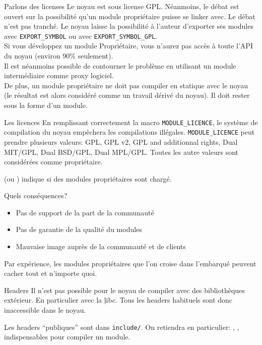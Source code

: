 \begin{frame}[fragile=singleslide]{Parlons des licenses}
  Le noyau est sous license GPL. Néanmoins, le débat est ouvert sur la
  possibilité  qu'un module  propriétaire puisse  se linker  avec.  Le
  débat n'est pas  tranché. Le noyau laisse la  possibilité à l'auteur
  d'exporter   ses   modules   avec   \verb+EXPORT_SYMBOL+   ou   avec
  \verb+EXPORT_SYMBOL_GPL+.
  \\[2ex]
  Si vous développez un module Propriétaire, vous n'aurez pas accès à
  toute l'API du noyau (environ 90\% seulement).
  \\[2ex]
  Il est néanmoins possible de contourner le problème en utilisant un
  module intermédiaire comme proxy logiciel.
  \\[2ex]
  De plus,  un module  propriétaire ne doit  pas compiler  en statique
  avec  le noyau  (le résultat  est alors  considéré comme  un travail
  dérivé du noyau). Il doit rester sous la forme d'un module.
\end{frame}

\begin{frame}[fragile=singleslide]{Les licences}
  En  remplissant  correctement  la  macro  \verb+MODULE_LICENCE+,  le
  système   de  compilation  du   noyau  empêchera   les  compilations
  illégales.   \verb+MODULE_LICENCE+ peut  prendre  plusieurs valeurs:
  GPL, GPL v2, GPL and additionnal rights, Dual MIT/GPL, Dual BSD/GPL,
  Dual  MPL/GPL.   Toutes les  autre  valeurs  sont considérées  comme
  propriétaire.

   (ou  ) indique  si des
  modules propriétaires sont chargé.
  
  Quels conséquences?
  \begin{itemize} 
  \item Pas de support de la part de la communauté
  \item Pas de garantie de la qualité du modules
  \item Mauvaise image auprès de la communauté et de clients
  \end{itemize}

  Par  expérience,  les modules  propriétaires  que  l'on croise  dans
  l'embarqué peuvent cacher tout et n'importe quoi.
\end{frame}

\begin{frame}[fragile=singleslide]{Headers}
  Il  n'est  pas   possible  pour  le  noyau  de   compiler  avec  des
  bibliothèques extérieur.  En particulier  avec la \c{libc}. Tous les
  headers habituels sont donc inaccessible dans le noyau.

  Les headers ``publiques'' sont dans \verb+include/+. On retiendra en
  particulier:       ,       ,
   indispensables pour compiler un module.
\end{frame} 


